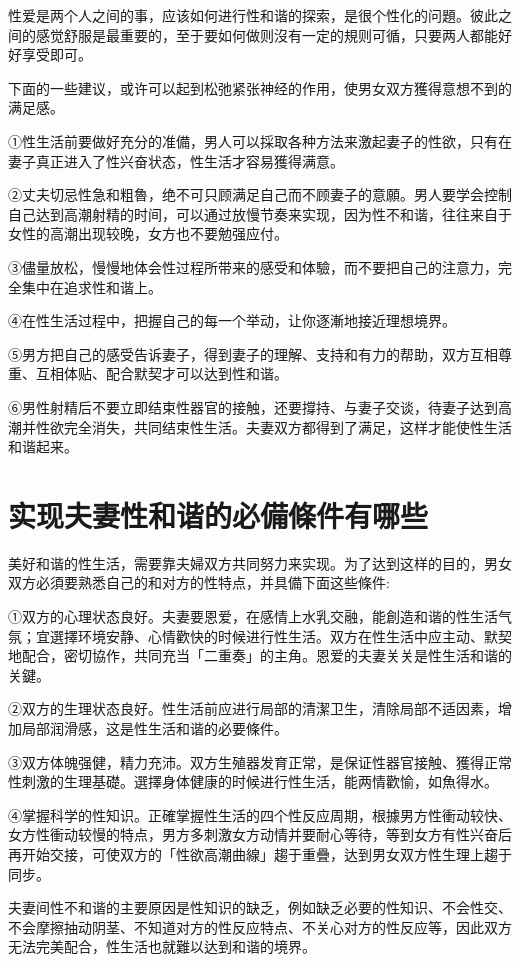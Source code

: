 \documentclass[12pt,UTF8]{ctexbook}
\begin{document}
性爱是两个人之间的事，应该如何进行性和谐的探索，是很个性化的问題。彼此之间的感觉舒服是最重要的，至于要如何做则沒有一定的規则可循，只要两人都能好好享受即可。

下面的一些建议，或许可以起到松弛紧张神经的作用，使男女双方獲得意想不到的满足感。

①性生活前要做好充分的准備，男人可以採取各种方法来激起妻子的性欲，只有在妻子真正进入了性兴奋状态，性生活才容易獲得满意。

②丈夫切忌性急和粗魯，绝不可只顾满足自己而不顾妻子的意願。男人要学会控制自己达到高潮射精的时间，可以通过放慢节奏来实现，因为性不和谐，往往来自于女性的高潮出现较晚，女方也不要勉强应付。

③儘量放松，慢慢地体会性过程所带来的感受和体驗，而不要把自己的注意力，完全集中在追求性和谐上。

④在性生活过程中，把握自己的每一个举动，让你逐漸地接近理想境界。

⑤男方把自己的感受告诉妻子，得到妻子的理解、支持和有力的帮助，双方互相尊重、互相体贴、配合默契才可以达到性和谐。

⑥男性射精后不要立即结束性器官的接触，还要撐持、与妻子交谈，待妻子达到高潮并性欲完全消失，共同结束性生活。夫妻双方都得到了满足，这样才能使性生活和谐起来。

\section{实现夫妻性和谐的必備條件有哪些}

美好和谐的性生活，需要靠夫婦双方共同努力来实现。为了达到这样的目的，男女双方必須要熟悉自己的和对方的性特点，并具備下面这些條件:

①双方的心理状态良好。夫妻要恩爱，在感情上水乳交融，能創造和谐的性生活气氛；宜選擇环境安静、心情歡快的时候进行性生活。双方在性生活中应主动、默契地配合，密切協作，共同充当「二重奏」的主角。恩爱的夫妻关关是性生活和谐的关鍵。

②双方的生理状态良好。性生活前应进行局部的清潔卫生，清除局部不适因素，增加局部润滑感，这是性生活和谐的必要條件。

③双方体魄强健，精力充沛。双方生殖器发育正常，是保证性器官接触、獲得正常性刺激的生理基礎。選擇身体健康的时候进行性生活，能两情歡愉，如魚得水。

④掌握科学的性知识。正確掌握性生活的四个性反应周期，根據男方性衝动较快、女方性衝动较慢的特点，男方多刺激女方动情并要耐心等待，等到女方有性兴奋后再开始交接，可使双方的「性欲高潮曲線」趨于重疊，达到男女双方性生理上趨于同步。

夫妻间性不和谐的主要原因是性知识的缺乏，例如缺乏必要的性知识、不会性交、不会摩擦抽动阴茎、不知道对方的性反应特点、不关心对方的性反应等，因此双方无法完美配合，性生活也就難以达到和谐的境界。
\end{document}
